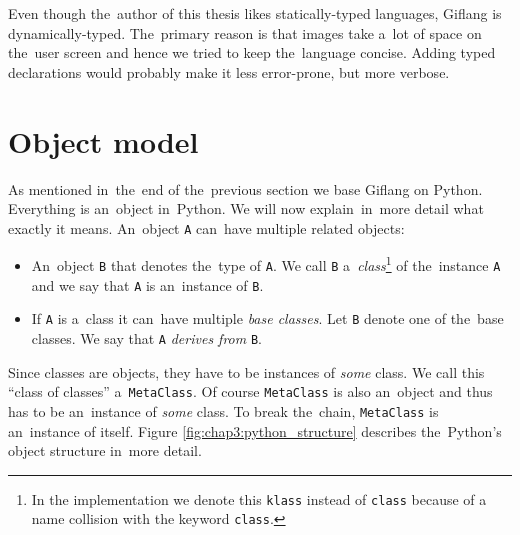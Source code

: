 Even though the~author of this thesis likes statically-typed languages, Giflang is dynamically-typed. The~primary reason is that images take a~lot of
space on the~user screen and hence we tried to keep the~language concise. Adding typed declarations would probably make it less error-prone, but more verbose.

\section{Object model}
\label{chap3:object_model}
As mentioned in~the~end of the~previous section we base Giflang on Python. Everything is an~object in~Python. We will now explain~in~more detail what exactly
it means. An~object \texttt{A} can~have multiple related objects:
\begin{itemize}
    \item An~object \texttt{B} that denotes the~type of \texttt{A}. We call \texttt{B} a~\emph{class}\footnote{In the implementation we denote this \texttt{klass}
    instead of \texttt{class} because of a name collision with the keyword \texttt{class}.} of the~instance \texttt{A} and we say that \texttt{A}
    is an~instance of \texttt{B}.
    \item If \texttt{A} is a~class it can~have multiple \emph{base classes}. Let \texttt{B} denote one of the~base classes. We say that \texttt{A}
    \emph{derives from} \texttt{B}. 
\end{itemize}

Since classes are objects, they have to be instances of \emph{some} class. We call this ``class of classes'' a~\texttt{MetaClass}. Of course
\texttt{MetaClass} is also an~object and thus has to be an~instance of \emph{some} class. To break the~chain, \texttt{MetaClass} is an~instance of itself.
Figure \ref{fig:chap3:python_structure} describes the~Python's object structure in~more detail.

